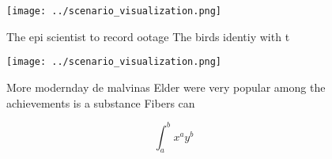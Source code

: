 \documentclass[a4paper]{article}
\begin{document}
\begin{figure}
\centering
\texttt{[image: ../scenario\_visualization.png]}
\caption{The epi scientist to record ootage The birds identiy with t
}
\end{figure}
 
\begin{figure}
\centering
\texttt{[image: ../scenario\_visualization.png]}
\caption{More modernday de malvinas Elder were very popular among the achievements is a substance Fibers can
}
\end{figure}
 
\[ \int_{a}^{b}{x^{a}y^{b}} \]
\end{document}
